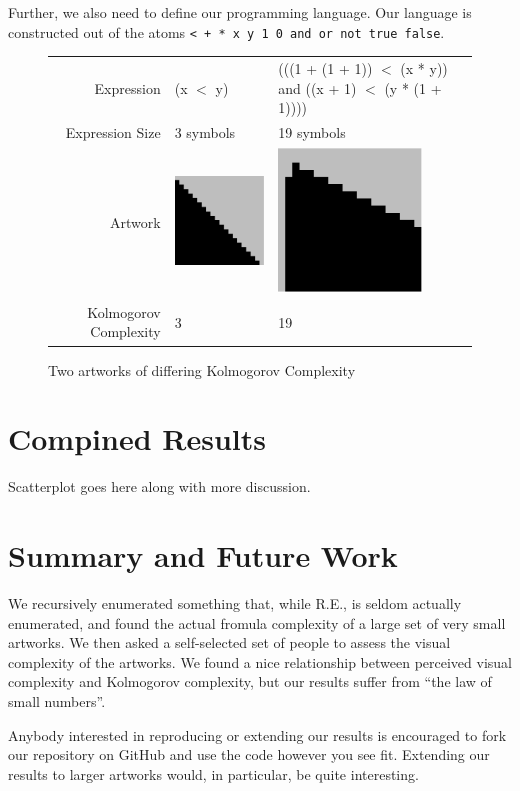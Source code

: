 \documentclass[11pt]{article}
\begin{document}
Further, we also need to define our programming language.  Our language is
constructed out of the atoms {\tt < + * x y 1 0 and or not true false}.


\begin{figure}
\begin{center}
\begin{tabular}{r | p{2in}   p{2in}}
Expression & (x $<$ y) &
(((1 + (1 + 1)) $<$  (x * y)) and 
          ((x + 1) $<$ (y * (1 + 1)))) \\
Expression Size & 3 symbols & 19 symbols\\
  Artwork & \includegraphics[width=1.5in]{../presentation/simple.png} &
  \includegraphics[width=1.5in]{../presentation/complex.png} \\
Kolmogorov Complexity& 3 &
19
\end{tabular}
\end{center}

\caption{Two artworks of differing Kolmogorov Complexity}
\end{figure}




\section{Compined Results}

Scatterplot goes here along with more discussion.

\section{Summary and Future Work}

We recursively enumerated something that, while R.E., is seldom actually
enumerated, and found the actual fromula complexity of a large set of very
small artworks.  We then asked a self-selected set of people to assess the
visual complexity of the artworks.  We found a nice relationship between
perceived visual complexity and Kolmogorov complexity, but our results suffer
from ``the law of small numbers''\cite{smallnumbers}.

Anybody interested in reproducing or extending our results is encouraged to
fork our repository on GitHub and use the code however you see fit.  Extending
our results to larger artworks would, in particular, be quite interesting.  
\end{document}
